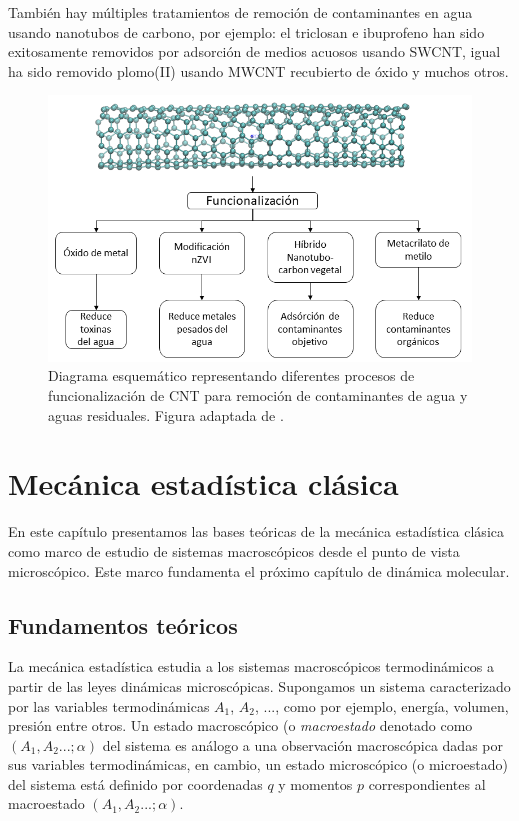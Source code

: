 También hay múltiples tratamientos de remoción de contaminantes en agua usando nanotubos de carbono, por ejemplo: el triclosan e ibuprofeno han sido exitosamente removidos por adsorción de medios acuosos usando SWCNT, igual ha sido removido plomo(II) usando MWCNT recubierto de óxido y muchos otros.\\

\begin{figure}[!h]
    \centering
    \includegraphics[width=.7\textwidth,keepaspectratio=true]{CNT/esquemafuncCNT.png}
    \caption{Diagrama esquemático representando diferentes procesos de funcionalización de CNT para remoción de contaminantes de agua y aguas residuales. Figura adaptada de \cite{SARKAR2018}.}
    \label{fig:remocioncontCNT}
\end{figure}

\chapter{Mecánica estadística clásica}\label{chap:mecanica_estadistica}

En este capítulo presentamos las bases teóricas de la mecánica estadística clásica como marco de estudio de sistemas macroscópicos desde el punto de vista microscópico. Este marco fundamenta el próximo capítulo de dinámica molecular.

\section{Fundamentos teóricos}

La mecánica estadística estudia a los sistemas macroscópicos termodinámicos a partir de las leyes dinámicas microscópicas. Supongamos un sistema caracterizado por las variables termodinámicas $A_1$, $A_2$, ..., como por ejemplo, energía, volumen, presión entre otros. Un estado macroscópico (o {\it macroestado} denotado como $(A_1, A_2...;\alpha)$ del sistema es análogo a una observación macroscópica dadas por sus variables termodinámicas, en cambio, un estado microscópico (o microestado) del sistema está definido por coordenadas $q$ y momentos $p$ correspondientes al macroestado $(A_1, A_2...;\alpha)$.\\

